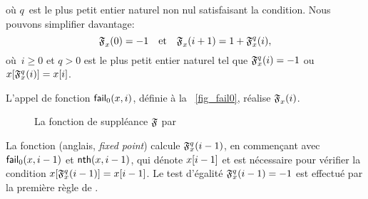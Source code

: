 où \(q\)~est le plus petit entier naturel non nul satisfaisant la
condition. Nous pouvons simplifier davantage:
\begin{equation*}
\mathfrak{F}_{x}^{}(0) = -1
\quad \text{et} \quad
\mathfrak{F}_{x}^{}(i+1) = 1 + \mathfrak{F}_{x}^{q}(i),
\end{equation*}
où~\(i \geqslant 0\) et \(q>0\) est le plus petit entier naturel tel
que \(\mathfrak{F}_{x}^{q}(i) = -1\) ou
\(\smash{{x}[{\mathfrak{F}_{x}^{q}(i)}]} = {x}[{i}]\).


L'appel de fonction
\(\textsf{fail}_0(x,i)\), définie à la
\fig~\vref{fig_fail0}, réalise \(\mathfrak{F}_{x}^{}(i)\).
\begin{figure}[t]
\abovedisplayskip=0pt
\belowdisplayskip=0pt
\caption{La fonction de suppléance \(\mathfrak{F}\) par 
\label{fig_fail0}}
\end{figure}
La fonction  (anglais, \emph{fixed
  point}) calcule \(\mathfrak{F}_{x}^{q}(i-1)\), en commençant avec
\(\textsf{fail}_0(x,i-1)\) et
\(\textsf{nth}(x,i-1)\), qui dénote
\({x}[{i-1}]\) et est nécessaire pour vérifier la condition
\(\smash{{x}[{\mathfrak{F}_{x}^{q}(i-1)}]} = {x}[{i-1}]\). Le test
d'égalité \(\mathfrak{F}_{x}^{q}(i-1) = -1\) est effectué par la première
règle de .

